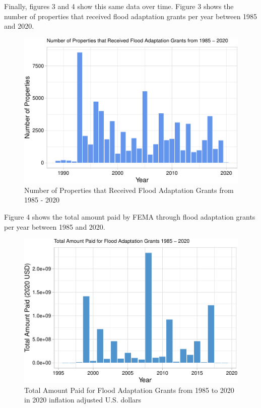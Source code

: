 \documentclass[
  12pt,
]{article}
\begin{document}
Finally, figures 3 and 4 show this same data over time. Figure 3 shows
the number of properties that received flood adaptation grants per year
between 1985 and 2020. \newline

\begin{figure}
\centering
\includegraphics{finalreport_files/figure-latex/unnamed-chunk-7-1.pdf}
\caption{Number of Properties that Received Flood Adaptation Grants from
1985 - 2020}
\end{figure}

Figure 4 shows the total amount paid by FEMA through flood adaptation
grants per year between 1985 and 2020. \newline

\begin{figure}
\centering
\includegraphics{finalreport_files/figure-latex/unnamed-chunk-8-1.pdf}
\caption{Total Amount Paid for Flood Adaptation Grants from 1985 to 2020
in 2020 inflation adjusted U.S. dollars}
\end{figure}
\end{document}
